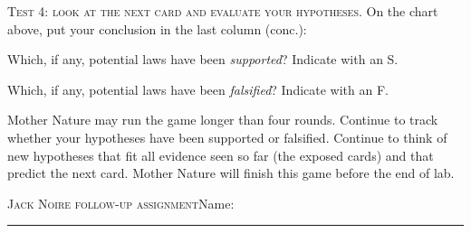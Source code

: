 \documentclass[12pt, addpoints]{exam}
\begin{document}
\noindent\textsc{Test 4: look at the next card and evaluate your hypotheses.} 
On the chart above, put your conclusion in the last column (conc.):\vspace*{0.33\baselineskip}

Which, if any, potential laws have been \textit{supported}? Indicate
with an S.\vspace*{0.33\baselineskip}

Which, if any, potential laws have been \textit{falsified}? Indicate
with an F.\vspace*{1\baselineskip}

Mother Nature may run the game longer than four rounds. Continue to track whether
your hypotheses have been supported or falsified. Continue to think of new hypotheses
that fit all evidence seen so far (the exposed cards) and that predict the next card.
Mother Nature will finish this game before the end of lab.

\newpage

\noindent\textsc{Jack Noire follow-up assignment}\hfill Name: \rule{2.25in}{0.4pt}


\vspace*{1\baselineskip}
\end{document}
